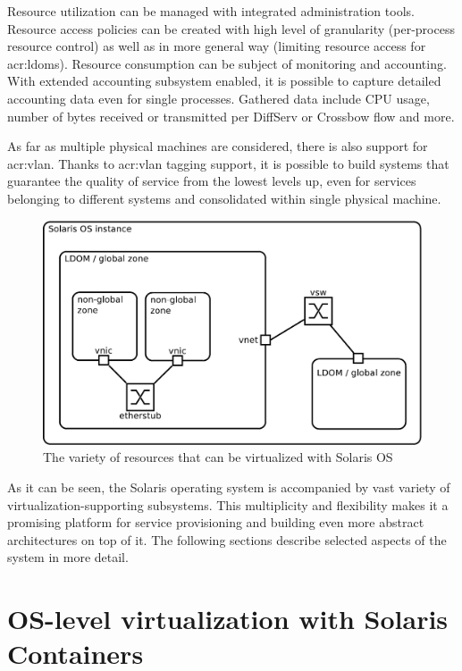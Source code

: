 \documentclass[11pt,openany]{book}
\begin{document}
      Resource utilization can be managed with integrated administration tools. Resource access policies can be created
      with high level of granularity (per-process resource control) as well as in more general way (limiting resource
      access for \gls{acr:ldom}s). Resource consumption can be subject of monitoring and accounting. With extended
      accounting subsystem enabled, it is possible to capture detailed accounting data even for single processes.
      Gathered data include CPU usage, number of bytes received or transmitted per DiffServ or Crossbow flow and more.

      As far as multiple physical machines are considered, there is also support for \gls{acr:vlan}.  Thanks to
      \gls{acr:vlan} tagging support, it is possible to build systems that guarantee the quality of service from the
      lowest levels up, even for services belonging to different systems and consolidated within single physical
      machine.

      \begin{figure}[H]
        \begin{center}
          \includegraphics[width=.7\textwidth]{img/solaris/full-featured.pdf}
        \end{center}

        \caption{The variety of resources that can be virtualized with Solaris OS}
      \end{figure}

      As it can be seen, the Solaris operating system is accompanied by vast variety of virtualization-supporting
      subsystems. This multiplicity and flexibility makes it a promising platform for service provisioning and building
      even more abstract architectures on top of it. The following sections describe selected aspects of the system in
      more detail.


    \section{OS-level virtualization with Solaris Containers}
    \label{sec:sol:containers}
\end{document}
